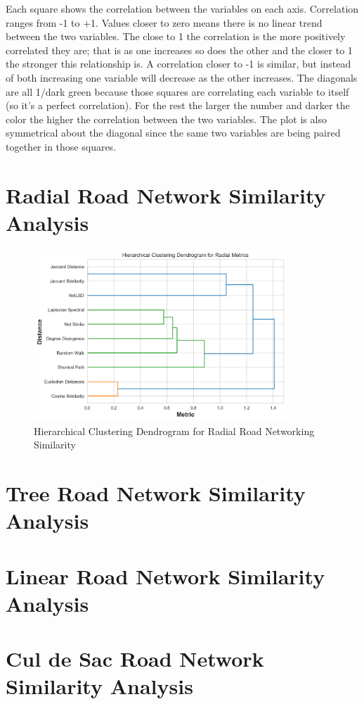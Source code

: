 Each square shows the correlation between the variables on each axis. Correlation ranges from -1 to +1. Values closer to zero means there is no linear trend between the two variables. The close to 1 the correlation is the more positively correlated they are; that is as one increases so does the other and the closer to 1 the stronger this relationship is. A correlation closer to -1 is similar, but instead of both increasing one variable will decrease as the other increases. The diagonals are all 1/dark green because those squares are correlating each variable to itself (so it's a perfect correlation). For the rest the larger the number and darker the color the higher the correlation between the two variables. The plot is also symmetrical about the diagonal since the same two variables are being paired together in those squares.

\section{Radial Road Network Similarity Analysis}
\begin{figure}[!ht]
\centering
\includegraphics[width=0.85\textwidth,center]{picture/Radial/radial_metrics_dendrogram.png}
\caption[Hierarchical Clustering Dendrogram for Radial Road Networking Similarity]{Hierarchical Clustering Dendrogram for Radial Road Networking Similarity}
\label{fig:Hierarchical Clustering Dendrogram for Radial Road Networking Similarity}
\end{figure}

\section{Tree Road Network Similarity Analysis}
\section{Linear Road Network Similarity Analysis}
\section{Cul de Sac Road Network Similarity Analysis}
